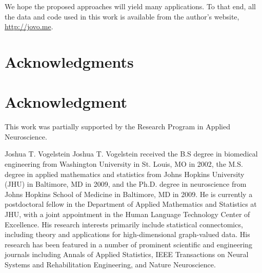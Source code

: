 \documentclass[10pt,journal,cspaper,compsoc]{IEEEtran}
\begin{document}
We hope the proposed approaches will yield many applications.  To that end, all the data and code used in this work is available from the author's website, \url{http://jovo.me}.  

% 
% 
% 


% 

\ifCLASSOPTIONcompsoc
  \section*{Acknowledgments}
\else
  \section*{Acknowledgment}
\fi

This work was partially supported by the Research Program in Applied Neuroscience. 

\ifCLASSOPTIONcaptionsoff
  \newpage
\fi





\begin{IEEEbiographynophoto}{Joshua T. Vogelstein}
Joshua T. Vogelstein received the B.S degree in biomedical engineering from Washington University in St. Louis, MO in 2002, the M.S. degree in applied mathematics and statistics from Johns Hopkins University (JHU) in Baltimore, MD in 2009, and the Ph.D. degree in neuroscience from Johns Hopkins School of Medicine in Baltimore, MD in 2009.  He is currently a postdoctoral fellow in the Department of Applied Mathematics and Statistics at JHU, with a joint appointment in the Human Language Technology Center of Excellence.  His research interests primarily include statistical connectomics, including theory and applications for high-dimensional graph-valued data. His research has been featured in a number of prominent scientific and engineering journals including Annals of Applied Statistics, IEEE Transactions on Neural Systems and Rehabilitation Engineering, and Nature Neuroscience.
\end{IEEEbiographynophoto}
\end{document}
